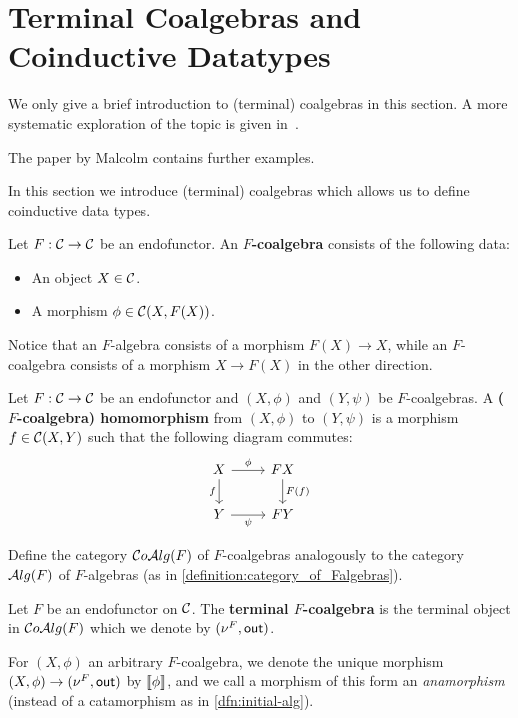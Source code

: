 \section{Terminal Coalgebras and Coinductive Datatypes}


\begin{reading*}
  We only give a brief introduction to (terminal) coalgebras in this section.
  A more systematic exploration of the topic is given in~\cite{DBLP:conf/fpca/MeijerFP91}.

  The paper \cite{DBLP:journals/scp/Malcolm90} by Malcolm contains further examples.
\end{reading*}


In this section we introduce (terminal) coalgebras which allows us to define coinductive data types.

\begin{dfn} Let $F:\mathcal{C}\to \mathcal{C}$ be an endofunctor. An \textbf{$F$-coalgebra} consists of the following data:
\begin{itemize}
\item An object $X\in \mathcal{C}$.
\item A morphism $\phi \in {\mathcal{C}}(X,F(X))$.
\end{itemize}
\end{dfn}
Notice that an $F$-algebra consists of a morphism $F(X)\to X$, while an $F$-coalgebra consists of a morphism $X\to F(X)$ in the other direction.

\begin{dfn} Let $F:\mathcal{C}\to \mathcal{C}$ be an endofunctor and $(X,\phi)$ and $(Y,\psi)$ be $F$-coalgebras. A \textbf{($F$-coalgebra) homomorphism} from $(X,\phi)$ to $(Y,\psi)$ is a morphism $f\in {\mathcal{C}}(X,Y)$ such that the following diagram commutes:
\[
\begin{tikzcd}
X
\arrow[r, "\phi"] 
\arrow[d,swap, "f"]
& FX
\arrow[d, "F(f)"] 
\\
Y
\arrow[r, swap, "\psi"] 
& FY
\end{tikzcd}
\]
\end{dfn}

\begin{exer} Define the category $\mathcal{C}o\mathcal{A}lg(F)$ of $F$-coalgebras analogously to the category $\mathcal{A}lg(F)$ of $F$-algebras (as in \cref{definition:category_of_Falgebras}).
\end{exer}

\begin{dfn} Let $F$ be an endofunctor on $\mathcal{C}$. The \textbf{terminal $F$-coalgebra} is the terminal object in $\mathcal{C}o\mathcal{A}lg(F)$ which we denote by $(\nu^{F}, \mathsf{out})$.
  
For $(X,\phi)$ an arbitrary $F$-coalgebra, we denote the unique morphism $(X,\phi) \to (\nu^{F}, \mathsf{out})$ by $\llbracket \phi \rrbracket$, and we call a morphism of this form an \textit{anamorphism} (instead of a catamorphism as in \cref{dfn:initial-alg}).
\end{dfn}

